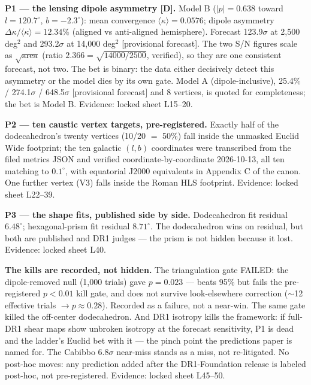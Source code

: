 \documentclass{alienfolio}
\begin{document}
\noindent\textbf{P1 --- the lensing dipole asymmetry [D].} Model B ($|p| = 0.638$ toward $l = 120.7^\circ$, $b = -2.3^\circ$): mean convergence $\langle\kappa\rangle = 0.0576$; dipole asymmetry $\Delta\kappa/\langle\kappa\rangle = 12.34\%$ (aligned vs anti-aligned hemisphere). Forecast 123.9$\sigma$ at 2,500 deg$^2$ and 293.2$\sigma$ at 14,000 deg$^2$ [provisional forecast]. The two S/N figures scale as $\sqrt{\mathrm{area}}$ (ratio $2.366 = \sqrt{14000/2500}$, verified), so they are one consistent forecast, not two. The bet is binary: the data either decisively detect this asymmetry or the model dies by its own gate. Model A (dipole-inclusive), 25.4\% / 274.1$\sigma$ / 648.5$\sigma$ [provisional forecast] and 8 vertices, is quoted for completeness; the bet is Model B. Evidence: locked sheet L15--20.

\noindent\textbf{P2 --- ten caustic vertex targets, pre-registered.} Exactly half of the dodecahedron's twenty vertices (10/20 $=$ 50\%) fall inside the unmasked Euclid Wide footprint; the ten galactic $(l, b)$ coordinates were transcribed from the filed metrics JSON and verified coordinate-by-coordinate 2026-10-13, all ten matching to $0.1^\circ$, with equatorial J2000 equivalents in Appendix C of the canon. One further vertex (V3) falls inside the Roman HLS footprint. Evidence: locked sheet L22--39.

\noindent\textbf{P3 --- the shape fits, published side by side.} Dodecahedron fit residual $6.48^\circ$; hexagonal-prism fit residual $8.71^\circ$. The dodecahedron wins on residual, but both are published and DR1 judges --- the prism is not hidden because it lost. Evidence: locked sheet L40.

\noindent\textbf{The kills are recorded, not hidden.} The triangulation gate FAILED: the dipole-removed null (1,000 trials) gave $p = 0.023$ --- beats 95\% but fails the pre-registered $p < 0.01$ kill gate, and does not survive look-elsewhere correction ($\sim$12 effective trials $\to p \approx 0.28$). Recorded as a failure, not a near-win. The same gate killed the off-center dodecahedron. And DR1 isotropy kills the framework: if full-DR1 shear maps show unbroken isotropy at the forecast sensitivity, P1 is dead and the ladder's Euclid bet with it --- the pinch point the predictions paper is named for. The Cabibbo 6.8$\sigma$ near-miss stands as a miss, not re-litigated. No post-hoc moves: any prediction added after the DR1-Foundation release is labeled post-hoc, not pre-registered. Evidence: locked sheet L45--50.
\end{document}
